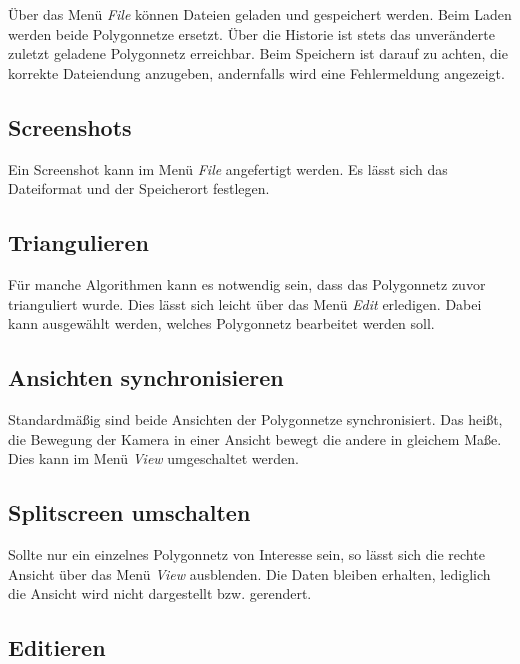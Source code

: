 Über das Menü \emph{File} können Dateien geladen und gespeichert werden.
Beim Laden werden beide Polygonnetze ersetzt.
Über die Historie ist stets das unveränderte zuletzt geladene Polygonnetz erreichbar.
Beim Speichern ist darauf zu achten, die korrekte Dateiendung anzugeben, andernfalls wird eine Fehlermeldung angezeigt.

\subsection{Screenshots}

Ein Screenshot kann im Menü \emph{File} angefertigt werden. 
Es lässt sich das Dateiformat und der Speicherort festlegen.

\subsection{Triangulieren}

Für manche Algorithmen kann es notwendig sein, dass das Polygonnetz zuvor trianguliert wurde.
Dies lässt sich leicht über das Menü \emph{Edit} erledigen.
Dabei kann ausgewählt werden, welches Polygonnetz bearbeitet werden soll.

\subsection{Ansichten synchronisieren}

Standardmäßig sind beide Ansichten der Polygonnetze synchronisiert.
Das heißt, die Bewegung der Kamera in einer Ansicht bewegt die andere in gleichem Maße.
Dies kann im Menü \emph{View} umgeschaltet werden.

\subsection{Splitscreen umschalten}

Sollte nur ein einzelnes Polygonnetz von Interesse sein, so lässt sich die rechte Ansicht über das Menü \emph{View} ausblenden.
Die Daten bleiben erhalten, lediglich die Ansicht wird nicht dargestellt bzw. gerendert.

\subsection{Editieren}


